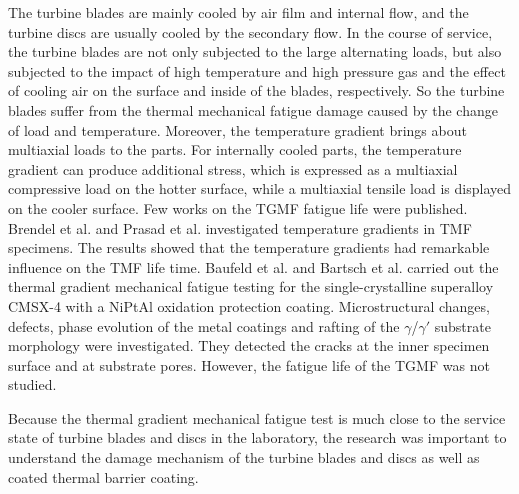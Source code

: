 The turbine blades are mainly cooled by air film and internal flow, and the turbine discs are usually cooled by the secondary flow.
In the course of service, the turbine blades are not only subjected to the large alternating loads, but also subjected to the impact of high temperature and high pressure gas and the effect of cooling air on the surface and inside of the blades, respectively. So the turbine blades suffer from the thermal mechanical fatigue damage caused by the change of load and temperature.
Moreover, the temperature gradient brings about multiaxial loads to the parts.
For internally cooled parts, the temperature gradient can produce additional stress, which is expressed as a multiaxial compressive load on the hotter surface, while a multiaxial tensile load is displayed on the cooler surface.
Few works on the TGMF fatigue life were published.
Brendel et al. \cite{BRENDEL2008234} and Prasad et al. \cite{PRASAD2013131} investigated temperature gradients in TMF specimens. The results showed that the temperature gradients had remarkable influence on the TMF life time.
Baufeld et al. \cite{BAUFELD2008219} and Bartsch et al. \cite{BARTSCH2008211} carried out the thermal gradient mechanical fatigue testing for the single-crystalline superalloy CMSX-4 with a NiPtAl oxidation protection coating. 
Microstructural changes, defects, phase evolution of the metal coatings and rafting of the $\gamma$/$\gamma'$ substrate morphology were investigated. They detected the cracks at the inner specimen surface and at substrate pores. However, the fatigue life of the TGMF was not studied.

Because the thermal gradient mechanical fatigue test is much close to the service state of turbine blades and discs in the laboratory, the research was important to understand the damage mechanism of the turbine blades and discs as well as coated thermal barrier coating.

